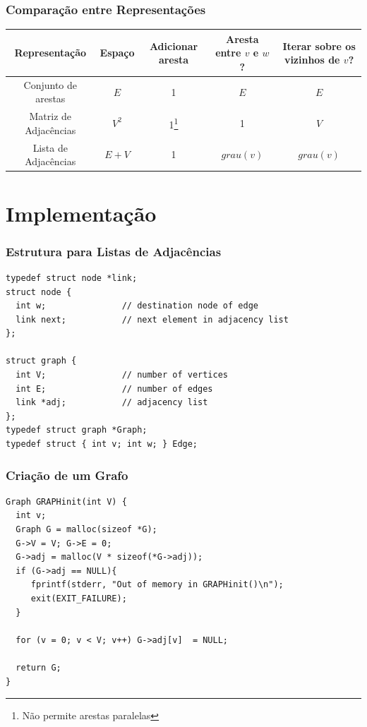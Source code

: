 \documentclass{beamer}
\begin{document}
\renewcommand{\thefootnote}{*}

\begin{frame}
  \frametitle{Comparação entre Representações}

  \begin{table}[]
    \centering
    \scriptsize
    \begin{tabular}{c|c|c|c|c}
      \toprule
      \textbf{Representação} & 
      \textbf{Espaço} & 
      \textbf{Adicionar aresta} & 
      \Centerstack[c]{\textbf{Aresta entre}\\ \textbf{$v$ e $w$?}} &
      \Centerstack[c]{\textbf{Iterar sobre}\\ \textbf{os vizinhos}\\ \textbf{de $v$?}}\\ 
      \midrule
      Conjunto de arestas & $E$ & 1 & $E$ & $E$ \\
      Matriz de Adjacências & $V^2$ & 1\footnote[frame]{Não permite arestas paralelas} & 1 & $V$\\
      Lista de Adjacências & $E+V$ & 1 & $grau(v)$ & $grau(v)$\\
      \bottomrule
    \end{tabular}
  \end{table}

\end{frame}

\section{Implementação}

\begin{frame}[fragile]
  \frametitle{Estrutura para Listas de Adjacências}

\begin{verbatim}
typedef struct node *link;
struct node {
  int w;               // destination node of edge
  link next;           // next element in adjacency list
};

struct graph {
  int V;               // number of vertices
  int E;               // number of edges
  link *adj;           // adjacency list
};
typedef struct graph *Graph;
typedef struct { int v; int w; } Edge;
\end{verbatim}

\end{frame}

\begin{frame}[fragile]
  \frametitle{Criação de um Grafo}

\begin{verbatim}
Graph GRAPHinit(int V) {
  int v;
  Graph G = malloc(sizeof *G);
  G->V = V; G->E = 0;
  G->adj = malloc(V * sizeof(*G->adj));
  if (G->adj == NULL){
     fprintf(stderr, "Out of memory in GRAPHinit()\n");
     exit(EXIT_FAILURE);
  }

  for (v = 0; v < V; v++) G->adj[v]  = NULL;

  return G;
}
\end{verbatim}
\end{frame}
\end{document}
